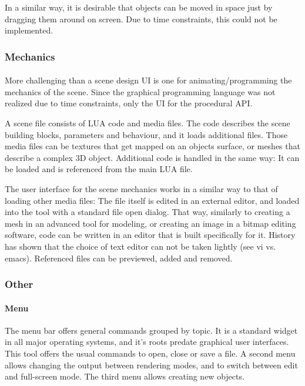 In a similar way, it is desirable that objects can be moved in space just by dragging them around on screen.
Due to time constraints, this could not be implemented.

\subsubsection{Mechanics}
\paragraph{}
More challenging than a scene design UI is one for animating/programming the mechanics of the scene.
Since the graphical programming language was not realized due to time constraints, only the UI for the procedural API.

A scene file consists of LUA code and media files.
The code describes the scene building blocks, parameters and behaviour, and it loads additional files.
Those media files can be textures that get mapped on an objects surface, or meshes that describe a complex 3D object.
Additional code is handled in the same way: It can be loaded and is referenced from the main LUA file.

The user interface for the scene mechanics works in a similar way to that of loading other media files:
The file itself is edited in an external editor, and loaded into the tool with a standard file open dialog.
That way, similarly to creating a mesh in an advanced tool for modeling, or creating an image in a bitmap editing software, code can be written in an editor that is built specifically for it.
History has shown that the choice of text editor can not be taken lightly (see vi vs. emacs).
Referenced files can be previewed, added and removed.

\subsubsection{Other}
\paragraph{Menu}
The menu bar offers general commands grouped by topic.
It is a standard widget in all major operating systems, and it's roots predate graphical user interfaces.
This tool offers the usual commands to open, close or save a file.
A second menu allows changing the output between rendering modes, and to switch between edit and full-screen mode.
The third menu allows creating new objects.

